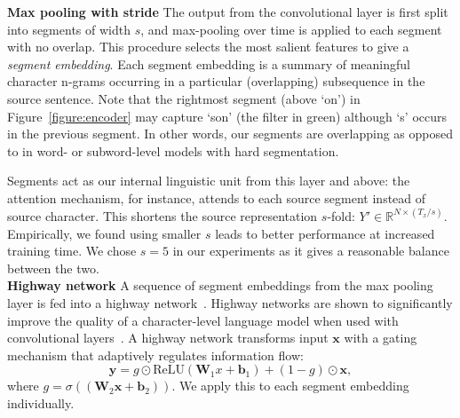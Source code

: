 \documentclass[11pt,letterpaper]{article}
\newcommand{\ti}{\textit}
\newcommand{\mb}{\mathbf}
\newcommand{\nrr}{\color{black}}
\begin{document}
    \noindent\textbf{Max pooling with stride} The output from the convolutional layer is first split into segments of width $s$, and max-pooling over time is applied to each segment with no overlap. This procedure selects the most salient features to give a \ti{segment embedding}. {\nrr Each segment embedding is a summary of meaningful character n-grams occurring in a particular (overlapping) subsequence in the source sentence. Note that the rightmost segment (above `on') in Figure~\ref{figure:encoder} may capture `son' (the filter in green) although `s' occurs in the previous segment. In other words, our segments are overlapping as opposed to in word- or subword-level models with hard segmentation.}

 Segments act as our internal linguistic unit from this layer and above: the attention mechanism, for instance, attends to each source segment instead of source character. This shortens the source representation $s$-fold: $Y' \in \mathbb{R}^{N \times (T_x / s)}.$ Empirically, we found using smaller $s$ leads to better performance at increased training time. We chose $s=5$ in our experiments as it gives a reasonable balance between the two. \\
    
    \noindent\textbf{Highway network} A sequence of segment embeddings from the max pooling layer is fed into a highway network~\cite{Srivastava:15}. Highway networks are shown to significantly improve the quality of a character-level language model when used with convolutional layers~\cite{Kim:15}. A highway network transforms input $\mb{x}$ with a gating mechanism that adaptively regulates information flow: $$\mb{y} = g \odot \text{ReLU}(\mb{W}_1x+\mb{b}_1) + (1-g) \odot \mb{x},$$ where $g=\sigma((\mb{W}_2\mb{x}+\mb{b}_2)).$ We apply this to each segment embedding individually. \\
\end{document}
